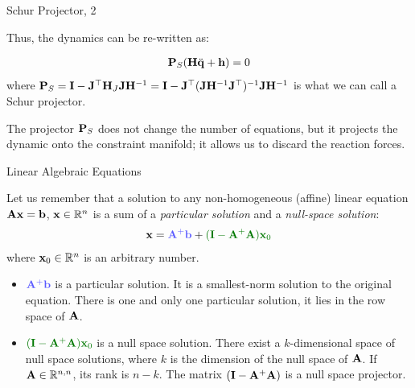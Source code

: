 \documentclass{beamer}
\begin{document}
\begin{frame}{Schur Projector, 2}
	\begin{flushleft}
		

Thus, the dynamics can be re-written as: 

		\begin{align}
			\mathbf{P}_S(\mathbf{H}\ddot{\mathbf{q}}+\mathbf{h})=0
		\end{align}
	where $\mathbf{P}_S = \mathbf{I}-\mathbf{J}^\top\mathbf{H}_J \mathbf{J} \mathbf{H}^{-1} = 
	\mathbf{I}-\mathbf{J}^\top ( \mathbf{J} \mathbf{H}^{-1} \mathbf{J}^\top )^{-1} \mathbf{J} \mathbf{H}^{-1}$ is what we can call a Schur projector.
	
	\bigskip
	
	The projector  $\mathbf{P}_S$ does not change the number of equations, but it projects the dynamic onto the constraint manifold; it allows us to discard the reaction forces.
		
	\end{flushleft}
\end{frame}



\begin{frame}{Linear Algebraic Equations}
	\begin{flushleft}
		
		Let us remember that a solution to any non-homogeneous (affine) linear equation $\mathbf{A} \mathbf{x} = \mathbf{b}$, $\mathbf{x} \in \mathbb{R}^n$ is a sum of a \emph{particular solution} and a \emph{null-space solution}:
		\begin{align}
			\bo{x} = \textcolor{myblue}{\bo{A}^+\bo{b}}
			 +
			 \textcolor{mydarkgreen}{(\bo{I}- \bo{A}^+\bo{A})\bo{x}_0} 
		\end{align}
		where $\mathbf{x}_0 \in \mathbb{R}^n$ is an arbitrary number.
		
		\begin{itemize}
			\item $\textcolor{myblue}{\bo{A}^+\bo{b}}$ is a particular solution. It is a smallest-norm solution to the original equation. There is one and only one particular solution, it lies in the row space of $\mathbf{A}$.
			
			\item $\textcolor{mydarkgreen}{(\bo{I}- \bo{A}^+\bo{A})\bo{x}_0}$ is a null space solution. There exist a $k$-dimensional space of null space solutions, where $k$ is the dimension of the null space of $\mathbf{A}$. If $\mathbf{A}\in \mathbb{R}^{n, n}$, its rank is $n-k$. The matrix $(\mathbf{I}- \mathbf{A}^+\mathbf{A})$ is a null space projector.
		\end{itemize}
		
	\end{flushleft}
\end{frame}
\end{document}
